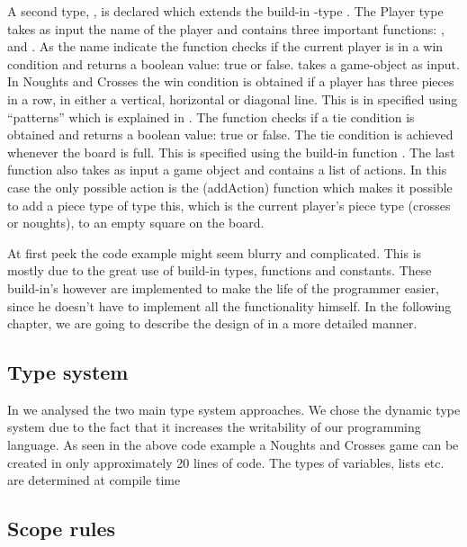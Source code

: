 A second type, , is declared which extends the build-in \productname{}-type . The Player type
takes as input the name of the player and contains three important functions: ,  and 
. As the name indicate the  function checks if the current player is in a win condition and returns
a boolean value: true or false.  takes a game-object as input. In Noughts and Crosses the win condition is obtained if a player has three pieces in a row, in either a vertical, horizontal or diagonal line. This is in \productname{} specified using ``patterns'' which is explained in . The  function checks if a tie condition is obtained and returns a boolean value: true or false. The tie condition is achieved whenever the board is full. This is specified using the build-in function . The last function  also takes as input a game object and contains a list of actions. In this case the only possible action is the \function(addAction) function which makes it possible to add a piece type of type this, which is the current player's piece type (crosses or noughts), to an empty square on the board.

At first peek the code example might seem blurry and complicated. This is mostly due to the great use of build-in
types, functions and constants. These build-in's however are implemented to make the life of the programmer easier, since 
he doesn't have to implement all the functionality himself. In the following chapter, we are going to describe the design of \productname{} in a
more detailed manner.  


\subsection*{Type system}

In  we analysed the two main type system approaches. 
We chose the dynamic type system due to the fact that it increases the writability of our programming language. As seen in the
above code example  a Noughts and Crosses game can be created in only approximately 20 lines
of code. The types of variables, lists etc. are determined at compile time



\subsection*{Scope rules}

